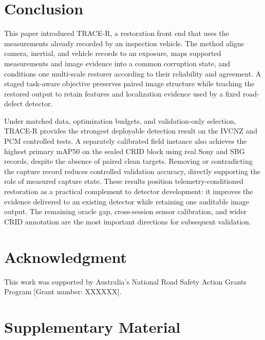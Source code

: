 \documentclass[journal]{IEEEtran}
\newcommand{\tracer}{TRACE-R\xspace}
\begin{document}
\section{Conclusion}
This paper introduced \tracer, a restoration front end that uses the measurements already recorded by an inspection vehicle. The method aligns camera, inertial, and vehicle records to an exposure, maps supported measurements and image evidence into a common corruption state, and conditions one multi-scale restorer according to their reliability and agreement. A staged task-aware objective preserves paired image structure while teaching the restored output to retain features and localization evidence used by a fixed road-defect detector.

Under matched data, optimization budgets, and validation-only selection, \tracer provides the strongest deployable detection result on the IVCNZ and PCM controlled tests. A separately calibrated field instance also achieves the highest primary mAP50 on the sealed CRID block using real Sony and SBG records, despite the absence of paired clean targets. Removing or contradicting the capture record reduces controlled validation accuracy, directly supporting the role of measured capture state. These results position telemetry-conditioned restoration as a practical complement to detector development: it improves the evidence delivered to an existing detector while retaining one auditable image output. The remaining oracle gap, cross-session sensor calibration, and wider CRID annotation are the most important directions for subsequent validation.

\section*{Acknowledgment}
This work was supported by Australia's National Road Safety Action Grants Program [Grant number: XXXXXX].




\clearpage
\makeatletter
\setlength{\@dblfptop}{0pt}
\setlength{\@dblfpsep}{10pt plus 2pt minus 2pt}
\setlength{\@dblfpbot}{0pt plus 1fil}
\makeatother
\renewcommand{\thesection}{S\arabic{section}}
\renewcommand{\thetable}{S\arabic{table}}
\renewcommand{\thefigure}{S\arabic{figure}}
\renewcommand{\theHsection}{supp.\arabic{section}}
\renewcommand{\theHtable}{supp.\arabic{table}}
\renewcommand{\theHfigure}{supp.\arabic{figure}}
\setcounter{section}{0}
\setcounter{table}{0}
\setcounter{figure}{0}
\section*{Supplementary Material}
\end{document}
